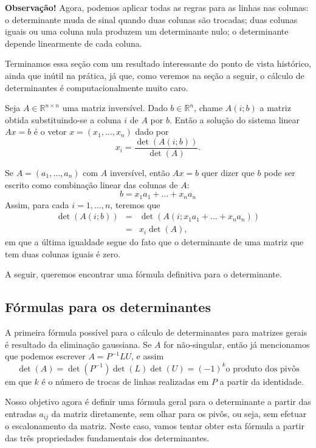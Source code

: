 \begin{itemize}
{\bf{Observação!}} Agora, podemos aplicar todas as regras para as linhas nas colunas: o determinante muda de sinal quando duas colunas são trocadas; duas colunas iguais ou uma coluna nula produzem um determinante nulo; o determinante depende linearmente de cada coluna. 
\end{itemize}

Terminamos essa seção com um resultado interessante do ponto de vista histórico, ainda que inútil na prática, já que, como veremos na seção a seguir, o cálculo de determinantes é computacionalmente muito caro.

\begin{prop}
   Seja $A\in {\mathbb{R}}^{n\times n}$ uma matriz inversível. Dado $b\in {\mathbb{R}}^n$, chame $A(i;b)$ a matriz obtida substituindo-se a coluna $i$ de $A$ por $b$. Então a solução do sistema linear $Ax=b$ é o vetor $x = (x_1,\ldots,x_n)$ dado por
   $$x_i = \frac{\det(A(i;b))}{\det(A)}.$$
\end{prop}
\bpr
Se $A = (a_1,\ldots,a_n)$ com $A$ inversível, então $Ax=b$ quer dizer que $b$ pode ser escrito como combinação linear das colunas de $A$:
$$b = x_1a_1+\ldots+x_na_n$$
Assim, para cada $i=1,\ldots,n$, teremos que
\begin{eqnarray*}
   \det(A(i;b)) &= & \det(A(i;x_1a_1+\ldots+x_na_n))\\
   &=& x_i \det(A),
\end{eqnarray*}
em que a última igualdade segue do fato que o determinante de uma matriz que tem duas colunas iguais é zero.
\epr

A seguir, queremos encontrar uma fórmula definitiva para o determinante. 

\subsection{Fórmulas para os determinantes}

A primeira fórmula possível para o cálculo de determinantes para matrizes gerais é resultado da eliminação gaussiana. Se $A$ for não-singular, então já mencionamos que podemos escrever $A=P^{-1}LU$, e assim
\begin{equation*}
  \det(A) = \det(P^{-1})\det(L)\det(U) = (-1)^k \text{o produto dos pivôs}
\end{equation*}
em que $k$ é o número de trocas de linhas realizadas em $P$ a partir da identidade.

Nosso objetivo agora é definir uma fórmula geral para o determinante a partir das entradas $a_{ij}$ da matriz diretamente, sem olhar para os pivôs, ou seja, sem efetuar o escalonamento da matriz. Neste caso, vamos tentar obter esta fórmula a partir das três propriedades fundamentais dos determinantes.

